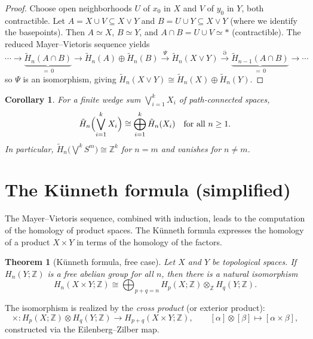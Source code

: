 \documentclass[12pt,a4paper,openany]{book}
\theoremstyle{definition}
\theoremstyle{plain}
\newtheorem{theorem}[definition]{Theorem}
\newtheorem{corollary}[definition]{Corollary}
\theoremstyle{remark}
\newcommand{\Z}{\mathbb{Z}}
\begin{document}
\begin{proof}
Choose open neighborhoods $U$ of $x_0$ in $X$ and $V$ of $y_0$ in $Y$,
both contractible. Let $A = X\cup V\subseteq X\vee Y$ and
$B = U\cup Y\subseteq X\vee Y$ (where we identify the basepoints).
Then $A\simeq X$, $B\simeq Y$, and $A\cap B = U\cup V\simeq *$
(contractible). The reduced Mayer--Vietoris sequence yields
\[
  \cdots \to \underbrace{\tilde{H}_n(A\cap B)}_{=\,0}
  \to \tilde{H}_n(A)\oplus\tilde{H}_n(B)
  \xrightarrow{\Psi} \tilde{H}_n(X\vee Y)
  \xrightarrow{\partial}
  \underbrace{\tilde{H}_{n-1}(A\cap B)}_{=\,0} \to \cdots
\]
so $\Psi$ is an isomorphism, giving
$\tilde{H}_n(X\vee Y)\cong\tilde{H}_n(X)\oplus\tilde{H}_n(Y)$.
\end{proof}

\begin{corollary}\label{cor:wedge-finite}
For a finite wedge sum $\bigvee_{i=1}^k X_i$ of path-connected spaces,
\[
  \tilde{H}_n\Bigl(\bigvee_{i=1}^k X_i\Bigr)
  \cong \bigoplus_{i=1}^k \tilde{H}_n(X_i)
  \quad\text{for all } n\geq 1.
\]
In particular, $\tilde{H}_n\bigl(\bigvee^k S^m\bigr)\cong\Z^k$
for $n=m$ and vanishes for $n\neq m$.
\end{corollary}

\section{The K\"unneth formula (simplified)}
\label{sec:mv-kunneth}

The Mayer--Vietoris sequence, combined with induction, leads to the
computation of the homology of product spaces. The K\"unneth formula
expresses the homology of a product $X\times Y$ in terms of the
homology of the factors.

\begin{theorem}[K\"unneth formula, free case]\label{thm:kunneth-free}
Let $X$ and $Y$ be topological spaces. If $H_n(Y;\Z)$ is a free abelian
group for all $n$, then there is a natural isomorphism
\[
  H_n(X\times Y;\Z) \cong \bigoplus_{p+q=n}
  H_p(X;\Z)\otimes_\Z H_q(Y;\Z).
\]
\end{theorem}

The isomorphism is realized by the \emph{cross product} (or exterior
product):
\[
  \times\colon H_p(X;\Z)\otimes H_q(Y;\Z)\longrightarrow H_{p+q}(X\times Y;\Z),
  \qquad [\alpha]\otimes[\beta]\longmapsto[\alpha\times\beta],
\]
constructed via the Eilenberg--Zilber map.
\end{document}
